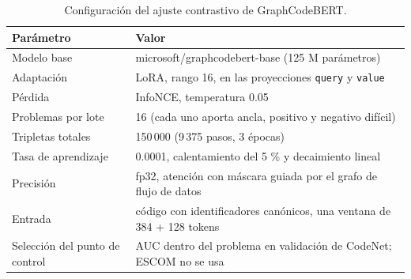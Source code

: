 \begin{table}[H]
\centering
\small
\begin{tabular}{|l|p{9cm}|}
\hline
\textbf{Parámetro} & \textbf{Valor} \\ \hline
Modelo base & microsoft/graphcodebert-base (125 M parámetros) \\ \hline
Adaptación & LoRA, rango 16, en las proyecciones \texttt{query} y \texttt{value} \\ \hline
Pérdida & InfoNCE, temperatura 0.05 \\ \hline
Problemas por lote & 16 (cada uno aporta ancla, positivo y negativo difícil) \\ \hline
Tripletas totales & 150\,000 (9\,375 pasos, 3 épocas) \\ \hline
Tasa de aprendizaje & 0.0001, calentamiento del 5 \% y decaimiento lineal \\ \hline
Precisión & fp32, atención con máscara guiada por el grafo de flujo de datos \\ \hline
Entrada & código con identificadores canónicos, una ventana de 384 + 128 tokens \\ \hline
Selección del punto de control & AUC dentro del problema en validación de CodeNet; ESCOM no se usa \\ \hline
\end{tabular}
\caption{Configuración del ajuste contrastivo de GraphCodeBERT.}
\label{tab:hiperparametros}
\end{table}
